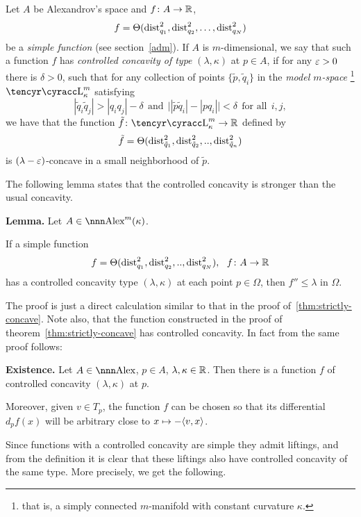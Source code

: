 \documentclass{article}
\begin{document}
Let $A$ be Alexandrov's space and $f\colon A\to \mathbb{R}$,
$$f=\Theta(\operatorname{dist}^2_{q_1},\operatorname{dist}^2_{q_2},\dots,\operatorname{dist}^2_{q_N})$$ be a \emph{simple
function} (see section~\ref{adm}).
If $A$ is $m$-dimensional, we say that such a function $f$ has \emph{controlled
concavity of type} $(\lambda,\kappa)$ at $p\in A$, if for any $\varepsilon>0$ there is
$\delta>0$, such that for any collection of points $\{\tilde p,\tilde q_i\}$ in
the \emph{model $m$-space}%
\footnote{that is, a simply connected $m$-manifold with
constant curvature $\kappa$.} $\Lob_\kappa^m$  satisfying 
$$|\tilde q_i\tilde q_j|> |q_i  q_j|-\delta\ \ \text{and}\ \  \bigl||\tilde
p\tilde q_i|-|p q_i|\bigr|<\delta \ \ \text{for all}\ \ i,j,$$ 
we have that the function 
$\tilde f\:\Lob_\kappa^m\to \RR$ defined by 
$$\tilde f=\Theta(\operatorname{dist}^2_{\tilde q_1},\operatorname{dist}^2_{\tilde q_2},..,\operatorname{dist}^2_{\tilde
q_n})$$
is $(\lambda-\varepsilon)$-concave in a small neighborhood of $\tilde p$.

The following lemma states that the controlled concavity is stronger than the usual
concavity.

\begin{thm}{\bf Lemma.} \label{contr-concave}
Let $A\in\Alex^m(\kappa)$.

If a simple function 
$$f=\Theta(\dist^2_{q_1},\dist^2_{q_2},..,\dist^2_{q_N}),\ \ f\:A\to\RR$$ 
has a controlled concavity type $(\lambda,\kappa)$ at each point $p\in \Omega$, then
$f''\le \lambda$ in $\Omega$. 
\end{thm}

The proof is just a direct calculation similar to that in the proof
of~\ref{thm:strictly-concave}. 
Note also, that the function constructed in the proof of
theorem~\ref{thm:strictly-concave} has controlled concavity.
In fact from the
same proof follows:

\begin{thm}{\bf Existence.} \label{exist-control}
Let $A\in\Alex$, $p\in A$, $\lambda,\kappa\in\mathbb{R}$.
Then there is a function $f$ of controlled concavity $(\lambda,\kappa)$
at $p$.

Moreover, given $v\in T_p$, the function $f$ can be chosen so that its differential $d_p f(x)$ will be arbitrary close to $x\mapsto -\langle v,x\rangle$.
\end{thm}

Since functions with a controlled concavity are simple they admit liftings, and
from the definition it is clear that these liftings also have controlled
concavity of the same type.
More precisely, we get the following.
\end{document}
